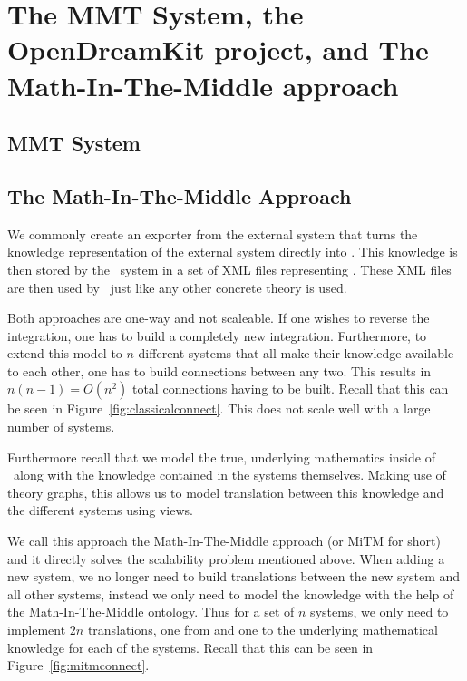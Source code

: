 \section{The MMT System, the OpenDreamKit project, and The Math-In-The-Middle approach}

\subsection{MMT System}

\subsection{The Math-In-The-Middle Approach}\label{sec:mitm:mitm}

We commonly create an exporter from the external system that turns the knowledge representation of the external system directly into \omdocmmt. 
This knowledge is then stored by the \mmt\ system in a set of XML files representing \omdocmmt. 
These XML files are then used by \mmt\ just like any other concrete theory is used. 

Both approaches are one-way and not scaleable. 
If one wishes to reverse the integration, one has to build a completely new integration. 
Furthermore, to extend this model to $n$ different systems that all make their knowledge available to each other, one has to build connections between any two. 
This results in $n (n - 1) = O(n^2)$ total connections having to be built. 
Recall that this can be seen in Figure~\ref{fig:classicalconnect}. 
This does not scale well with a large number of systems. 

Furthermore recall that we model the true, underlying mathematics inside of \mmt\ along with the knowledge contained in the systems themselves. Making use of theory graphs, this allows us to model translation between this knowledge and the different systems using views. 

We call this approach the Math-In-The-Middle approach (or MiTM for short) and it directly solves the scalability problem mentioned above. 
When adding a new system, we no longer need to build translations between the new system and all other systems, instead we only need to model the knowledge with the help of the Math-In-The-Middle ontology. 
Thus for a set of $n$ systems, we only need to implement $2n$ translations, one from and one to the underlying mathematical knowledge for each of the systems. 
Recall that this can be seen in Figure~\ref{fig:mitmconnect}. 

